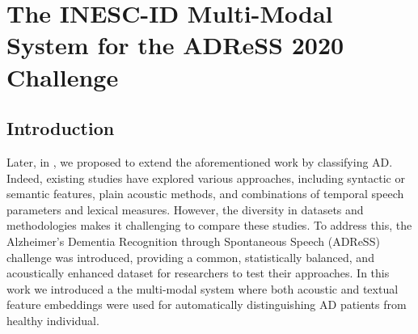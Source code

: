 
\section{The INESC-ID Multi-Modal System for the ADReSS 2020 Challenge}
\subsection{Introduction}
Later, in \cite{pompili2020inesc}, we proposed to extend the aforementioned work by classifying \ac{AD}. Indeed, existing studies have explored various approaches, including syntactic or semantic features, plain acoustic methods, and combinations of temporal speech parameters and lexical measures. However, the diversity in datasets and methodologies makes it challenging to compare these studies. To address this, the Alzheimer's Dementia Recognition through Spontaneous Speech (ADReSS) challenge was introduced, providing a common, statistically balanced, and acoustically enhanced dataset for researchers to test their approaches. In this work we introduced a  the multi-modal system where both acoustic and textual feature embeddings were used for automatically distinguishing \ac{AD} patients
from healthy individual. 

